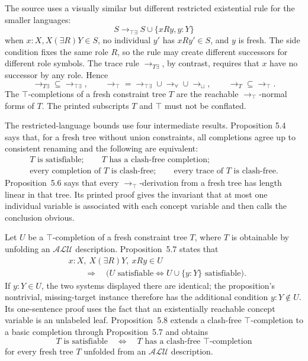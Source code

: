The source uses a visually similar but different restricted existential rule
for the smaller languages:
\[
 S\to_{\top\exists}S\cup\{xRy,y:Y\}
\]
when \(x:X,X(\exists R)Y\in S\), no individual \(y'\) has \(xRy'\in S\),
and \(y\) is fresh.  The side condition fixes the same role \(R\), so the rule
may create different successors for different role symbols.  The trace rule
\(\to_{T\exists}\), by contrast, requires that \(x\) have no successor by any
role.  Hence
\[
 \to_{T\exists}\subseteq\to_{\top\exists},\qquad
 \to_{\top}
   =\to_{\top\exists}\cup\to_{\forall}\cup\to_{\sqcup},
 \qquad
 \to_T\subseteq\to_{\top}.
\]
The \(\top\)-completions of a fresh constraint tree \(T\) are the reachable
\(\to_{\top}\)-normal forms of \(T\).  The printed subscripts \(T\) and
\(\top\) must not be conflated.

The restricted-language bounds use four intermediate results.  Proposition
5.4 says that, for a fresh tree without union constraints, all completions
agree up to consistent renaming and the following are equivalent:
\[
\begin{gathered}
 T\text{ is satisfiable};\qquad
 T\text{ has a clash-free completion};\\
 \text{every completion of }T\text{ is clash-free};\qquad
 \text{every trace of }T\text{ is clash-free}.
\end{gathered}
\]
Proposition~5.6 says that every \(\to_{\top}\)-derivation from a fresh tree
has length linear in that tree.  Its printed proof gives the invariant that at
most one individual variable is associated with each concept variable and
then calls the conclusion obvious.

Let \(U\) be a \(\top\)-completion of a fresh constraint tree \(T\), where
\(T\) is obtainable by unfolding an \(\mathcal{ALU}\) description.
Proposition~5.7 states that
\[
\begin{aligned}
 &x:X,\ X(\exists R)Y,\ xRy\in U\\
 &\qquad\Longrightarrow\quad
 \bigl(U\text{ satisfiable}\Longleftrightarrow
       U\cup\{y:Y\}\text{ satisfiable}\bigr).
\end{aligned}
\]
If \(y:Y\in U\), the two systems displayed there are identical; the
proposition's nontrivial, missing-target instance therefore has the additional
condition \(y:Y\notin U\).  Its one-sentence proof uses the fact that an
existentially reachable concept variable is an unlabeled leaf.
Proposition~5.8 extends a clash-free
\(\top\)-completion to a basic completion through Proposition~5.7 and obtains
\[
 T\text{ is satisfiable}
 \quad\Longleftrightarrow\quad
 T\text{ has a clash-free }\top\text{-completion}
\]
for every fresh tree \(T\) unfolded from an \(\mathcal{ALU}\) description.

